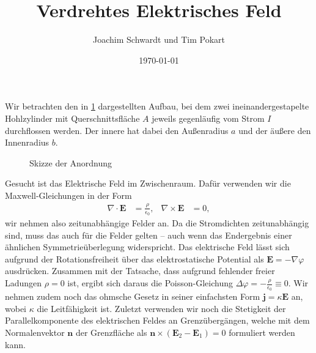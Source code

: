 \documentclass{article}
\title{Verdrehtes Elektrisches Feld}
\author{ Joachim Schwardt und Tim Pokart}
\date{\today}
\renewcommand{\vec}{\boldsymbol}
\begin{document}
\maketitle

Wir betrachten den in \cref{fig:sketch} dargestellten Aufbau, bei dem zwei ineinandergestapelte Hohlzylinder mit Querschnittsfläche $A$ jeweils gegenläufig vom Strom $I$ durchflossen werden. 
Der innere hat dabei den Außenradius $a$ und der äußere den Innenradius $b$.
\begin{figure}[htb]
    \centering
    
    \caption{Skizze der Anordnung}
    \label{fig:sketch}
\end{figure}
Gesucht ist das Elektrische Feld im Zwischenraum.
Dafür verwenden wir die Maxwell-Gleichungen in der Form
\begin{align*}
    \nabla\cdot \vec{E} &= \frac{\rho }{\epsilon_0}, & \nabla \times \vec{E} &= 0,
\end{align*}
wir nehmen also zeitunabhängige Felder an. 
Da die Stromdichten zeitunabhängig sind, muss das auch für die Felder gelten -- auch wenn das Endergebnis einer ähnlichen Symmetrieüberlegung widerspricht.
Das elektrische Feld lässt sich aufgrund der Rotationsfreiheit über das elektrostatische Potential als $\vec{E} = -\nabla \varphi$ ausdrücken.
Zusammen mit der Tatsache, dass aufgrund fehlender freier Ladungen $\rho = 0$ ist, ergibt sich daraus die Poisson-Gleichung $\Delta \varphi = -\frac{\rho}{\epsilon_0} \equiv 0$.
Wir nehmen zudem noch das ohmsche Gesetz in seiner einfachsten Form $\vec{j} = \kappa \vec{E}$ an, wobei $\kappa$ die Leitfähigkeit ist.
Zuletzt verwenden wir noch die Stetigkeit der Parallelkomponente des elektrischen Feldes an Grenzübergängen, welche mit dem Normalenvektor $\vec{n}$ der Grenzfläche als $\vec{n} \times (\vec{E}_2 - \vec{E}_1) = 0$ formuliert werden kann.
\end{document}
